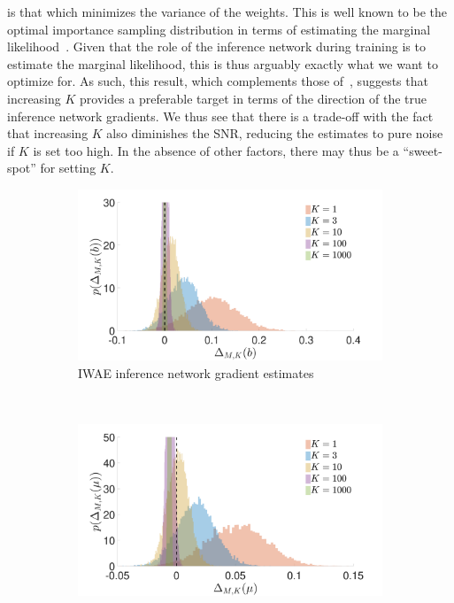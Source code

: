 is that which minimizes the variance of the weights.  This is well known to be 
the optimal importance sampling
distribution in terms of estimating the marginal likelihood~\citep{Mcbook}.
Given that the role of the inference network during training is to estimate the
marginal likelihood, this is thus arguably exactly what we want to optimize for.  
As such, this result, which complements those
of~\cite{Cremer2017reinterpreting}, suggests that increasing 
$K$ provides a preferable target in terms of the direction of the
true inference network gradients.  We thus see that there is a trade-off with the fact that increasing $K$ also diminishes
the \gls{SNR}, reducing the estimates to pure noise if $K$ is
set too high.   In the absence of other factors, there may thus be a ``sweet-spot'' for 
setting $K$.

\begin{figure}[t]
	\centering
	\begin{subfigure}[b]{0.4\textwidth}
		\centering
		\includegraphics[width=\textwidth]{figures/tighter_bounds/b_hist_IWAE} %
		\caption{ \gls{IWAE} inference network gradient estimates \label{fig:snr/b_hist_iwae}}
	\end{subfigure} ~~~~~~~~~~~~~
	\begin{subfigure}[b]{0.4\textwidth}
		\centering
		\includegraphics[width=\textwidth]{figures/tighter_bounds/mu_hist_IWAE} %

\end{subfigure}
\end{figure}
